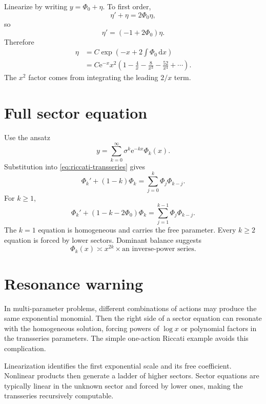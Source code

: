 \documentclass[11pt,oneside]{book}
\theoremstyle{definition}
\theoremstyle{remark}
\newcommand{\e}{\mathrm{e}}
\newcommand{\dd}{\,\mathrm{d}}
\begin{document}
Linearize by writing $y=\Phi_0+\eta$. To first order,
\[
  \eta'+\eta=2\Phi_0\eta,
\]
so
\[
  \eta'=(-1+2\Phi_0)\eta.
\]
Therefore
\begin{align*}
  \eta
  &=C\exp\left(-x+2\int\Phi_0\dd x\right)\\
  &=C\e^{-x}x^2
   \left(1-\frac4x-\frac8{x^3}
   -\frac{52}{x^4}+\cdots\right).
\end{align*}
The $x^2$ factor comes from integrating the leading $2/x$ term.

\section{Full sector equation}

Use the ansatz
\[
  y=\sum_{k=0}^{\infty}
  \sigma^k\e^{-kx}\Phi_k(x).
\]
Substitution into \eqref{eq:riccati-transseries} gives
\begin{equation}
  \Phi_k'+(1-k)\Phi_k
  =\sum_{j=0}^{k}\Phi_j\Phi_{k-j}.
  \label{eq:riccati-sector-equation}
\end{equation}
For $k\ge1$,
\begin{equation}
  \Phi_k'+(1-k-2\Phi_0)\Phi_k
  =\sum_{j=1}^{k-1}\Phi_j\Phi_{k-j}.
  \label{eq:riccati-sector-recursive}
\end{equation}
The $k=1$ equation is homogeneous and carries the free parameter. Every
$k\ge2$ equation is forced by lower sectors. Dominant balance suggests
\[
  \Phi_k(x)\asymp x^{2k}\times
  \text{an inverse-power series}.
\]

\section{Resonance warning}

In multi-parameter problems, different combinations of actions may produce the
same exponential monomial. Then the right side of a sector equation can resonate
with the homogeneous solution, forcing powers of $\log x$ or polynomial factors
in the transseries parameters. The simple one-action Riccati example avoids this
complication.

\begin{summarybox}
Linearization identifies the first exponential scale and its free coefficient.
Nonlinear products then generate a ladder of higher sectors. Sector equations
are typically linear in the unknown sector and forced by lower ones, making the
transseries recursively computable.
\end{summarybox}
\end{document}
